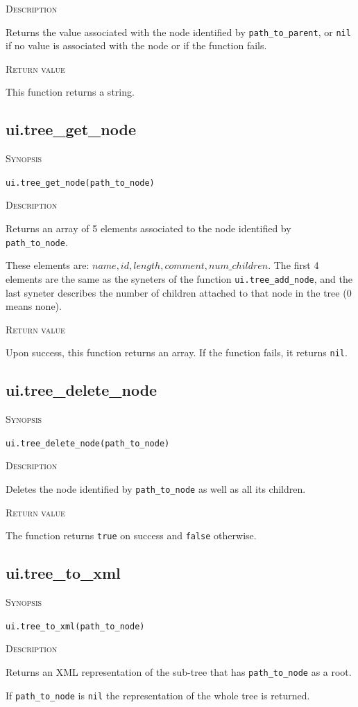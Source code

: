 \documentclass[11pt]{report}
\newcommand{\mansection}[1]{\vspace{0.5em}\par\noindent\textsc{#1}\vspace{0.5em}\par}
\newcommand{\syn}[1]{\texttt{#1}}
\begin{document}
\mansection{Description}
  Returns the value associated with the node identified by \syn{path\_to\_parent}, 
  or \syn{nil} if no value is associated with the node or if the function fails.

\mansection{Return value}
  This function returns a string.
 

\subsection{ui.tree\_get\_node}

\mansection{Synopsis}
\syn{ui.tree\_get\_node(path\_to\_node)}

\mansection{Description}
  Returns an array of 5 elements associated to the node identified by 
  \syn{path\_to\_node}.
 
  These elements are: ${name, id, length, comment, num\_children}$. 
  The first 4 elements are the same as the syneters of the function 
  \syn{ui.tree\_add\_node}, and the last syneter describes the number of 
  children attached to that node in the tree (0 means none).

\mansection{Return value}
  Upon success, this function returns an array.
  If the function fails, it returns \syn{nil}.

\subsection{ui.tree\_delete\_node}

\mansection{Synopsis}
\syn{ui.tree\_delete\_node(path\_to\_node)}

\mansection{Description}
  Deletes the node identified by \syn{path\_to\_node} as well as all its 
  children.

\mansection{Return value}
  The function returns \syn{true} on success and \syn{false} otherwise.


\subsection{ui.tree\_to\_xml}

\mansection{Synopsis}
\syn{ui.tree\_to\_xml(path\_to\_node)}

\mansection{Description}
  Returns an XML representation of the sub-tree that has \syn{path\_to\_node} 
  as a root.
	  
  If \syn{path\_to\_node} is \syn{nil} the representation of the whole 
  tree is returned.
  
\end{document}
